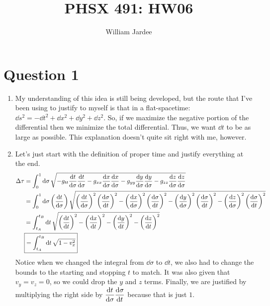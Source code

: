 \documentclass[11pt]{article}
\begin{document}
\title{PHSX 491: HW06}
\author{William Jardee}
\maketitle

\section*{Question 1}
\begin{enumerate}[label=\alph*)]
\item My understanding of this idea is still being developed, but the route that I've been using to justify to myself is that in a flat-spacetime: $\dd{s}^2 = -\dd{t}^2 + \dd{x}^2 + \dd{y}^2 + \dd{z}^2$. So, if we maximize the negative portion of the differential then we minimize the total differential. Thus, we want $\dd{t}$ to be as large as possible. This explanation doesn't quite sit right with me, however.


\item Let's just start with the definition of proper time and justify everything at the end.
\begin{align*}
\Delta\tau & = \int_0^1 \dd{\sigma}\sqrt{-g_{tt}\dv{t}{\sigma}\dv{t}{\sigma} - g_{xx}\dv{x}{\sigma}\dv{x}{\sigma} - g_{yy}\dv{y}{\sigma}\dv{y}{\sigma}-g_{zz}\dv{z}{\sigma}\dv{z}{\sigma}}\\
&= \int_0^1 \dd{\sigma}\left(\dv{t}{\sigma}\right)\sqrt{\left(\dv{t}{\sigma}\right)^2\left(\dv{\sigma}{t}\right)^2- \left(\dv{x}{\sigma}\right)^2\left(\dv{\sigma}{t}\right)^2 - \left(\dv{y}{\sigma}\right)^2\left(\dv{\sigma}{t}\right)^2 - \left(\dv{z}{\sigma}\right)^2\left(\dv{\sigma}{t}\right)^2}\\
&= \int_{t_A}^{t_B}\dd{t}\sqrt{\left(\dv{t}{t}\right)^2 - \left(\dv{x}{t}\right)^2 - \left(\dv{y}{t}\right)^2 - \left(\dv{z}{t}\right)^2}\\
& \boxed{= \int_{t_A}^{t_B} \dd{t}\sqrt{1 - v_x^2}}
\end{align*}
Notice when we changed the integral from $\dd{\sigma}$ to $\dd{t}$, we also had to change the bounds to the starting and stopping $t$ to match. It was also given that $v_y = v_z = 0$, so we could drop the $y$ and $z$ terms. Finally, we are justified by multiplying the right side by $\displaystyle{\dv{t}{\sigma}\dv{\sigma}{t}}$ because that is just $1$.



\end{enumerate}
\end{document}
